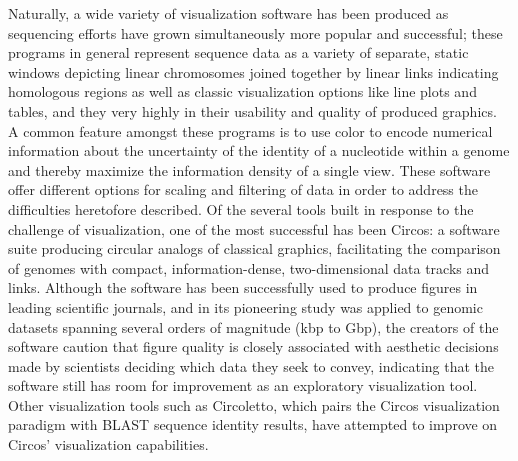 \documentclass[twocolumn]{article}
\begin{document}
Naturally, a wide variety of visualization software has been produced as sequencing efforts have grown simultaneously more popular and successful; these programs in general represent sequence data as a variety of separate, static windows depicting linear chromosomes joined together by linear links indicating homologous regions as well as classic visualization options like line plots and tables, and they very highly in their usability and quality of produced graphics. A common feature amongst these programs is to use color to encode numerical information about the uncertainty of the identity of a nucleotide within a genome and thereby maximize the information density of a single view. These software offer different options for scaling and filtering of data in order to address the difficulties heretofore described.\cite{challenge} Of the several tools built in response to the challenge of visualization, one of the most successful has been Circos: a software suite producing circular analogs of classical graphics, facilitating the comparison of genomes with compact, information-dense, two-dimensional data tracks and links. %
Although the software has been successfully used to produce figures in leading scientific journals, and in its pioneering study was applied to genomic datasets spanning several orders of magnitude (kbp to Gbp), the creators of the software caution that figure quality is closely associated with aesthetic decisions made by scientists deciding which data they seek to convey, indicating that the software still has room for improvement as an exploratory visualization tool. Other visualization tools such as Circoletto, which pairs the Circos visualization paradigm with BLAST sequence identity results, have attempted to improve on Circos' visualization capabilities.\cite{circoletto} %
\end{document}
